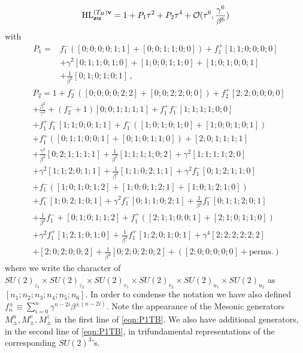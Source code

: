 \documentclass[main.tex]{subfiles}
\begin{document}
\begin{equation}
\textrm{HL}^{(T_B)\mathbf{v}}_{\mathbf{z}\mathbf{u}}=1+P_1\tau^2+P_2\tau^4+\mathcal{O}(\tau^6,\frac{\gamma^6}{\beta^6})
\end{equation}
with
\begin{equation}
\begin{aligned}\label{eqn:P1TB}
P_1=&f_1^-([0;0;0;0;1;1]+[0;0;1;1;0;0])+f_1^+ [1;1;0;0;0;0]\\
&+\gamma ^2[0;1;1;0;1;0]+[1;0;0;1;1;0]+[1;0;1;0;0;1]\\
&+\frac{1}{\beta^2}[0;1;0;1;0;1]\,,
\end{aligned}
\end{equation}
\begingroup
\allowdisplaybreaks
\begin{equation}
\begin{aligned}
&P_2=1+f^-_2([0;0;0;0;2;2]+[0;0;2;2;0;0])+f^+_2[2;2;0;0;0;0]\\
&+\frac{\beta ^2}{\gamma ^2}+\left(f^-_2+1\right)
   [0;0;1;1;1;1]+f_1^+f_1^-[1;1;1;1;0;0]\\
   &+f_1^+f_1^-[1;1;0;0;1;1]+f_1^-([1;0;1;0;1;0]+[1;0;0;1;0;1])\\
   &+f_1^+([0;1;1;0;0;1]+[0;1;0;1;1;0])+[2;0;1;1;1;1]\\
   &+\frac{\gamma ^2}{\beta ^2}[0;2;1;1;1;1]+\frac{1}{\beta ^2}[1;1;1;1;0;2]+\gamma ^2[1;1;1;1;2;0]\\
   &+\gamma ^2[1;1;2;0;1;1]+\frac{1}{\beta ^2}[1;1;0;2;1;1]+\gamma^2f_1^-[0;1;2;1;1;0]\\
   &+f_1^- ([1;0;1;0;1;2]+[1;0;0;1;2;1]+[1;0;1;2;1;0])\\
   &+f_1^-[1;0;2;1;0;1]+\gamma^2f_1^-[0;1;1;0;2;1]+\frac{1}{\beta^2}f_1^-[0;1;1;2;0;1]\\
   &+\frac{1}{\beta^2}f_1^-+[0;1;0;1;1;2]+f_1^+ ([2;1;1;0;0;1]+[2;1;0;1;1;0])\\
&+\gamma^2f_1^+[1;2;1;0;1;0]+\frac{1}{\beta^2}f_1^+[1;2;0;1;0;1]+\gamma ^4[2;2;2;2;2;2]\\
   &+[2;0;2;0;0;2]+\frac{1}{\beta ^4}[0;2;0;2;0;2]+\left([2;0;0;0;0;0]+\text{perms.}\right)
\end{aligned}
\end{equation}
\endgroup
where we write the character of $SU(2)_{z_1}\times SU(2)_{z_2}\times SU(2)_{v_1}\times SU(2)_{v_2}\times SU(2)_{u_1}\times SU(2)_{u_2}$ as $[n_1;n_2;n_3;n_4;n_5;n_6]$. In order to condense the notation we have also defined $f^{\pm}_n\equiv\sum_{i=0}^{n}\gamma^{n-2i}\beta^{\pm (n-2i)}$. Note the appearance of the Mesonic generators $M^{u}_{\pm},M^{v}_{\pm},M^{z}_{\pm}$ in the first line of \eqref{eqn:P1TB}. We also have additional generators, in the second line of \eqref{eqn:P1TB}, in trifundamental representations of the corresponding $SU(2)^3$'s. 
\end{document}
